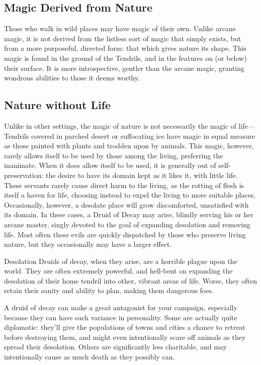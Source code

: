 \begin{multicols}{2}

\section{Magic Derived from Nature}
Those who walk in wild places may have magic of their own.
Unlike arcane magic, it is not derived from the listless sort of magic that simply exists, but from a more purposeful, directed form: that which gives nature its shape.
This magic is found in the ground of the Tendrils, and in the features on (or below) their surface.
It is more introspective, gentler than the arcane magic, granting wondrous abilities to those it deems worthy. 

\subsection{Nature without Life}
Unlike in other settings, the magic of nature is not necessarily the magic of life---Tendrils covered in parched desert or suffocating ice have magic in equal measure as those painted with plants and trodden upon by animals.
This magic, however, rarely allows itself to be used by those among the living, preferring the inanimate.
When it does allow itself to be used, it is generally out of self-preservation: the desire to have its domain kept as it likes it, with little life.
These servants rarely cause direct harm to the living, as the rotting of flesh is itself a haven for life, choosing instead to expel the living to more suitable places.
\label{druidofdecay}
Occasionally, however, a desolate place will grow discomforted, unsatisfied with its domain.
In these cases, a Druid of Decay may arise, blindly serving his or her arcane master, singly devoted to the goal of expanding desolation and removing life.
Most often these evils are quickly dispatched by those who preserve living nature, but they occasionally may have a larger effect.

\begin{adventureidea}[0.3\textheight]{Desolation}
Druids of decay, when they arise, are a horrible plague upon the world.
They are often extremely powerful, and hell-bent on expanding the desolation of their home tendril into other, vibrant areas of life.
Worse, they often retain their sanity and ability to plan, making them dangerous foes.

A druid of decay can make a great antagonist for your campaign, especially because they can have such variance in personality.
Some are actually quite diplomatic: they'll give the populations of towns and cities a chance to retreat before destroying them, and might even intentionally scare off animals as they spread their desolation.
Others are significantly less charitable, and may intentionally cause as much death as they possibly can.
\end{adventureidea}


\end{multicols}
